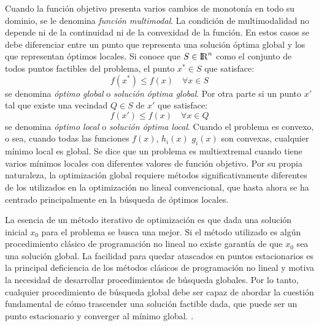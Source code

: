 Cuando la función objetivo presenta varios cambios de monotonía en todo su dominio, se le denomina \textit{función multimodal}. La condición de multimodalidad no depende ni de la continuidad ni de la convexidad de la función. En estos casos se debe diferenciar entre un punto que representa una solución óptima global y los que representan óptimos locales. Si conoce que $S \in {\rm I\!R}^{n}$ como el conjunto de todos puntos factibles del problema, el punto $x^* \in S$  que satisface:
\begin{equation}
f(x^*) \leq f(x) \quad \forall x \in S
\end{equation}
se denomina \textit{óptimo global} o \textit{solución óptima global}. Por otra parte si un punto $x'$  tal que existe una vecindad $Q \in S$ de $x'$ que satisface:
\begin{equation}
f(x') \leq f(x) \quad \forall x \in Q
\end{equation}
se denomina \textit{óptimo local} o \textit{solución óptima local}. Cuando el problema es convexo, o sea, cuando todas las funciones $f(x)$, $h_i(x)$ $g_i(x)$ son convexas, cualquier mínimo local es global. Se dice que un problema es multiextremal cuando tiene varios mínimos locales con diferentes valores de función objetivo. Por su propia naturaleza, la optimización global requiere métodos significativamente diferentes de los utilizados en la optimización no lineal convencional, que hasta ahora se ha centrado principalmente en la búsqueda de óptimos locales.

La esencia de un método iterativo de optimización es que dada una solución inicial $x_0$ para el problema se busca una mejor. Si el método utilizado es algún procedimiento clásico de programación no lineal no existe garantía de que $x_0$ sea una solución global. La facilidad para quedar atascados en puntos estacionarios es la principal deficiencia de los métodos clásicos de programación no lineal y motiva la necesidad de desarrollar procedimientos de búsqueda globales. Por lo tanto, cualquier procedimiento de búsqueda global debe ser capaz de abordar la cuestión fundamental de cómo trascender una solución factible dada, que puede ser un punto estacionario y converger al mínimo global.
\cite{tuy_convex_2015}.

